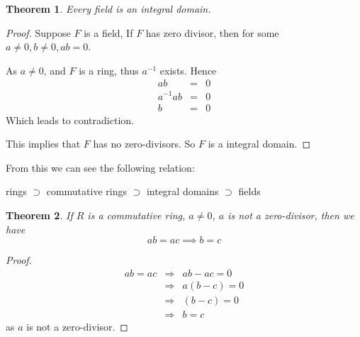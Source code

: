 \documentclass{article}
\theoremstyle{MyNonumberplain}
\theoremstyle{break}
\newtheorem*{proof}{Proof. }
\theoremstyle{break}
\newtheorem{theorem}{Theorem}[section]
\theoremstyle{break}
\theoremstyle{definition}
\theoremstyle{break}
\begin{document}
\begin{thmbox}
    \begin{theorem}
        Every field is an integral domain.
    \end{theorem}
    \begin{prfbox}
        \begin{proof}
            Suppose $F$ is a field, If $F$ has zero divisor, then for some $a \neq 0, b
            \neq 0, a b = 0$.\bigskip
            
            As $a \neq 0$, and $F$ is a ring, thus $a^{- 1}$ exists. Hence
            \begin{eqnarray*}
              a b & = & 0\\
              a^{- 1} a b & = & 0\\
              b & = & 0
            \end{eqnarray*}
            Which leads to contradiction.\bigskip
            
            This implies that $F$ has no zero-divisors. So $F$ is a integral domain.
        \end{proof}
    \end{prfbox}
\end{thmbox}

From this we can see the following relation:

\begin{center}
    rings $\supset$ commutative rings $\supset$ integral domains $\supset$ fields
\end{center}

\begin{thmbox}
    \begin{theorem}
        If $R$ is a commutative ring, $a \neq 0$, $a$ is not a zero-divisor, then we
        have
        $$ab=ac\implies b=c$$
    \end{theorem}
    \begin{prfbox}
        \begin{proof}
            \begin{eqnarray*}
                a b = a c & \Rightarrow & a b - a c = 0\\
                & \Rightarrow & a (b - c) = 0\\
                & \Rightarrow & (b - c) = 0\\
                & \Rightarrow & b = c
              \end{eqnarray*}
              as $a$ is not a zero-divisor.
        \end{proof}
    \end{prfbox}
\end{thmbox}
\end{document}
